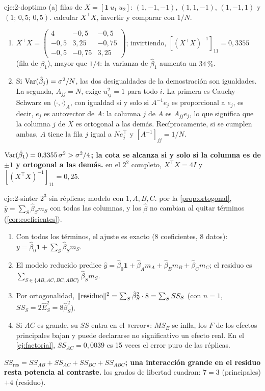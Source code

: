 \begin{solucion}{eje:2-doptimo}
\datos (a) filas de $X=[\mathbf 1\ u_1\ u_2]$: $(1,-1,-1)$, $(1,1,-1)$, $(1,-1,1)$ y $(1;\,0{,}5;\,0{,}5)$.
\planteamiento calcular $X^\top X$, invertir y comparar con $1/N$.
\pasos
\begin{enumerate}[label=(\alph*)]
  \item $X^\top X=\begin{pmatrix}4&-0{,}5&-0{,}5\\-0{,}5&3{,}25&-0{,}75\\-0{,}5&-0{,}75&3{,}25\end{pmatrix}$; invirtiendo, $[(X^\top X)^{-1}]_{11}=0{,}3355$ (fila de $\beta_1$), mayor que $1/4$: la varianza de $\hat\beta_1$ aumenta un $34\,\%$.
  \item Si $\operatorname{Var}(\hat\beta_j)=\sigma^2/N$, las dos desigualdades de la demostración son igualdades. La segunda, $A_{jj}=N$, exige $u_{ij}^2=1$ para todo $i$. La primera es Cauchy--Schwarz en $\langle\cdot,\cdot\rangle_A$, con igualdad si y solo si $A^{-1}e_j$ es proporcional a $e_j$, es decir, $e_j$ es autovector de $A$: la columna $j$ de $A$ es $A_{jj}e_j$, lo que significa que la columna $j$ de $X$ es ortogonal a las demás. Recíprocamente, si se cumplen ambas, $A$ tiene la fila $j$ igual a $Ne_j^\top$ y $[A^{-1}]_{jj}=1/N$.
\end{enumerate}
\resultado \textbf{$\operatorname{Var}(\hat\beta_1)=0{,}3355\,\sigma^2>\sigma^2/4$; la cota se alcanza si y solo si la columna es de $\pm1$ y ortogonal a las demás.}
\comprobacion en el $2^2$ completo, $X^\top X=4I$ y $[(X^\top X)^{-1}]_{11}=0{,}25$.
\end{solucion}

\begin{solucion}{eje:2-sinter}
\datos $2^3$ sin réplicas; modelo con $1,A,B,C$.
\planteamiento por la \cref{prop:ortogonal}, $\bar y=\sum_S\hat\beta_Sm_S$ con todas las columnas, y los $\hat\beta$ no cambian al quitar términos (\cref{cor:coeficientes}).
\pasos
\begin{enumerate}[label=\arabic*.]
  \item Con todos los términos, el ajuste es exacto (8 coeficientes, 8 datos): $y=\hat\beta_0\mathbf 1+\sum_{S}\hat\beta_Sm_S$.
  \item El modelo reducido predice $\hat y=\hat\beta_0\mathbf 1+\hat\beta_Am_A+\hat\beta_Bm_B+\hat\beta_Cm_C$; el residuo es $\sum_{S\in\{AB,AC,BC,ABC\}}\hat\beta_Sm_S$.
  \item Por ortogonalidad, $\lVert\text{residuo}\rVert^2=\sum_S\hat\beta_S^2\cdot8=\sum_S SS_S$ (con $n=1$, $SS_S=2\hat E_S^2=8\hat\beta_S^2$).
  \item Si $AC$ es grande, su $SS$ entra en el «error»: $MS_E$ se infla, los $F$ de los efectos principales bajan y puede declararse no significativo un efecto real. En el \cref{ej:factorial}, $SS_{AC}=0{,}0039$ es 15 veces el error puro de las réplicas.
\end{enumerate}
\resultado \textbf{$SS_{\text{res}}=SS_{AB}+SS_{AC}+SS_{BC}+SS_{ABC}$; una interacción grande en el residuo resta potencia al contraste.}
\comprobacion los grados de libertad cuadran: $7=3$ (principales) $+4$ (residuo).
\end{solucion}

